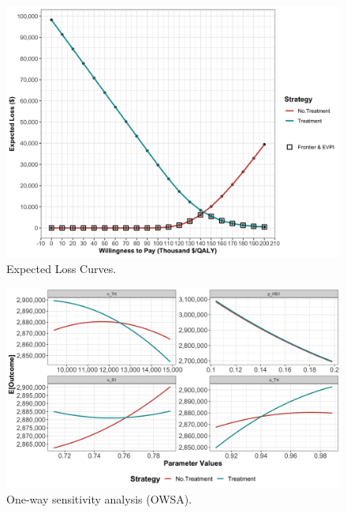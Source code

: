 \documentclass[]{book}
\begin{document}
\begin{figure}

{\centering \includegraphics[width=1\linewidth]{../figs/05b_elc} 

}

\caption{Expected Loss Curves.}\label{fig:05b-elc}
\end{figure}

\begin{figure}

{\centering \includegraphics[width=1\linewidth]{../figs/05b_owsa_lrm_nmb} 

}

\caption{One-way sensitivity analysis (OWSA).}\label{fig:05b-owsa-lrm-nmb}
\end{figure}
\end{document}
